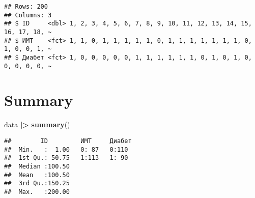 \documentclass[
]{article}
\newenvironment{Shaded}{\begin{snugshade}}{\end{snugshade}}
\newcommand{\DecValTok}[1]{\textcolor[rgb]{0.00,0.00,0.81}{#1}}
\newcommand{\FunctionTok}[1]{\textcolor[rgb]{0.13,0.29,0.53}{\textbf{#1}}}
\newcommand{\NormalTok}[1]{#1}
\newcommand{\OtherTok}[1]{\textcolor[rgb]{0.56,0.35,0.01}{#1}}
\newcommand{\SpecialCharTok}[1]{\textcolor[rgb]{0.81,0.36,0.00}{\textbf{#1}}}
\newcommand{\StringTok}[1]{\textcolor[rgb]{0.31,0.60,0.02}{#1}}
\begin{document}
\begin{Shaded}
\end{Shaded}

\begin{verbatim}
## Rows: 200
## Columns: 3
## $ ID     <dbl> 1, 2, 3, 4, 5, 6, 7, 8, 9, 10, 11, 12, 13, 14, 15, 16, 17, 18, ~
## $ ИМТ    <fct> 1, 1, 0, 1, 1, 1, 1, 1, 0, 1, 1, 1, 1, 1, 1, 1, 0, 1, 0, 0, 1, ~
## $ Диабет <fct> 1, 0, 0, 0, 0, 0, 1, 1, 1, 1, 1, 1, 0, 1, 0, 1, 0, 0, 0, 0, 0, ~
\end{verbatim}

\section{Summary}\label{summary}

\begin{Shaded}
\begin{Highlighting}[]
\NormalTok{data }\SpecialCharTok{|\textgreater{}} \FunctionTok{summary}\NormalTok{()}
\end{Highlighting}
\end{Shaded}

\begin{verbatim}
##        ID         ИМТ     Диабет 
##  Min.   :  1.00   0: 87   0:110  
##  1st Qu.: 50.75   1:113   1: 90  
##  Median :100.50                  
##  Mean   :100.50                  
##  3rd Qu.:150.25                  
##  Max.   :200.00
\end{verbatim}
\end{document}
